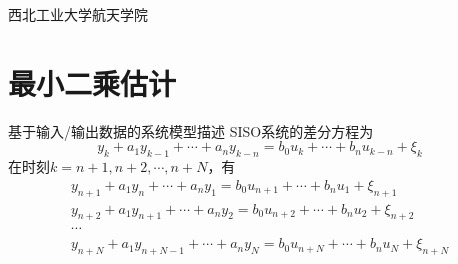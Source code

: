 \DeclareMathOperator*{\argmin}{arg\,min}

\newcommand{\vect}[1]{\boldsymbol{#1}}

\def\lecturename{系统辨识}

\title{\insertlecture}

\author{邢超}

\institute
{
  西北工业大学航天学院
}


\subtitle{白噪声情况}
\date{2012}



\begin{frame}
  \maketitle
\end{frame}

\section{最小二乘估计}

\begin{frame}{基于输入/输出数据的系统模型描述}
SISO系统的差分方程为
$$
y_k+a_1 y_{k-1}+\cdots + a_n y_{k-n}=b_0 u_k+\cdots + b_n u_{k-n}+\xi_k
$$
在时刻$k=n+1,n+2,\cdots,n+N$，有
\begin{gather*}
y_{n+1}+a_1 y_n+\cdots + a_n y_1 = b_0 u_{n+1}+\cdots + b_n u_1+\xi_{n+1}  \\
y_{n+2}+a_1 y_{n+1}+\cdots + a_n y_2 = b_0 u_{n+2}+\cdots + b_n u_{2}+\xi_{n+2}  \\
\cdots    \\
y_{n+N}+a_1 y_{n+N-1}+\cdots + a_n y_{N} = b_0 u_{n+N}+\cdots + b_n u_{N}+\xi_{n+N}
\end{gather*}
\end{frame}


